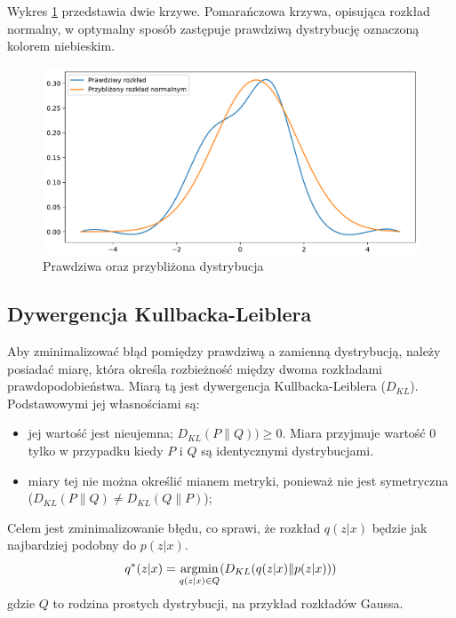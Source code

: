 \documentclass[a4paper,12pt,oneside]{book} %
\begin{document}
Wykres \ref{fig:app} przedstawia dwie krzywe. Pomarańczowa krzywa, opisująca rozkład normalny, w optymalny sposób zastępuje prawdziwą dystrybucję oznaczoną kolorem niebieskim.
\begin{figure}[h!]
	\centering
	\includegraphics[width=12cm]{approximate.pdf}
	\caption{Prawdziwa oraz przybliżona dystrybucja}
		\label{fig:app}
\end{figure} 

\subsection{Dywergencja Kullbacka-Leiblera}
Aby zminimalizować błąd pomiędzy prawdziwą a zamienną dystrybucją, należy posiadać miarę, która określa rozbieżność między dwoma rozkładami prawdopodobieństwa. Miarą tą jest dywergencja Kullbacka-Leiblera ($D_{KL}$). Podstawowymi jej własnościami są:
\begin{itemize}
	\item jej wartość jest nieujemna; $D_{KL}(P\|Q)) \geq 0$. Miara przyjmuje wartość 0 tylko w przypadku kiedy $P$ i $Q$ są identycznymi dystrybucjami.
	\item miary tej nie można określić mianem metryki, ponieważ nie jest symetryczna ($D_{KL}(P\|Q)\neq D_{KL}(Q\|P)$);
\end{itemize}
Celem jest zminimalizowanie błędu, co sprawi, że rozkład $q(z|x)$ będzie jak najbardziej podobny do $p(z|x)$.
\begin{equation}
	q^\ast(z|x)=\operatorname*{argmin}_{q(z|x)\in Q}(D_{KL}(q(z|x)\|p(z|x)))\\
		\label{qopt}
\end{equation}
gdzie $Q$ to rodzina prostych dystrybucji, na przykład rozkładów Gaussa.
\end{document}
